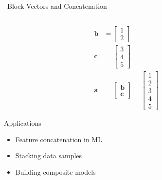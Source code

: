 \documentclass[12pt,aspectratio=169]{beamer}
\begin{document}
\begin{frame}{\faLayerGroup \, Block Vectors and Concatenation}
\begin{columns}[T]
    \begin{column}{0.35\textwidth}
        \begin{example}
            \begin{align}
                \mathbf{b} &= \begin{bmatrix} 1 \\ 2 \end{bmatrix} \\[0.3cm]
                \mathbf{c} &= \begin{bmatrix} 3 \\ 4 \\ 5 \end{bmatrix} \\[0.3cm]
                \mathbf{a} &= \begin{bmatrix} \mathbf{b} \\ \mathbf{c} \end{bmatrix} = \begin{bmatrix} 1 \\ 2 \\ 3 \\ 4 \\ 5 \end{bmatrix}
            \end{align}
        \end{example}
        
        \begin{alertblock}{Applications}
            \small
            \begin{itemize}
                \item Feature concatenation in ML
                \item Stacking data samples
                \item Building composite models
            \end{itemize}
        \end{alertblock}
    \end{column}
\end{columns}
\end{frame}
\end{document}
